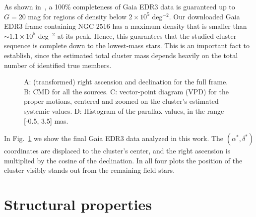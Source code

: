 \documentclass[draft]{aa}
\begin{document}
 As shown in~\cite{Fabricius_2020}, a 100\% completeness of Gaia EDR3 data is
 guaranteed up to $G=20$ mag for regions of density below $2\times10^5$
 deg$^{-2}$. Our downloaded Gaia EDR3 frame containing NGC 2516 has a maximum
 density that is smaller than $\sim1.1\times10^5$ deg$^{-2}$ at its peak.
 Hence, this guarantees that the studied cluster sequence is complete down to
 the lowest-mass stars. This is an important fact to establish, since the
 estimated total cluster mass depends heavily on the total number of
 identified true  members.\\

 \begin{figure}
 \caption{A: (transformed) right ascension and declination for the full frame.
 B: CMD for all the sources.
 C: vector-point diagram (VPD) for the proper motions, centered and zoomed on
 the cluster's estimated systemic values.
 D: Histogram of the parallax values, in the range [-0.5, 3.5] mas.}
 \label{fig:ngc2516_4}
 \end{figure}

 In Fig.~\ref{fig:ngc2516_4} we show the final Gaia EDR3 data analyzed in this
 work. The $(\alpha^{*}, \delta^{*})$ coordinates are displaced to the
 cluster's center, and the right ascension is multiplied by the cosine of the
 declination. In all four plots the position of the cluster visibly stands out
 from the remaining field stars.




\section{Structural properties}
 \label{sec:structure}
 
\end{document}
